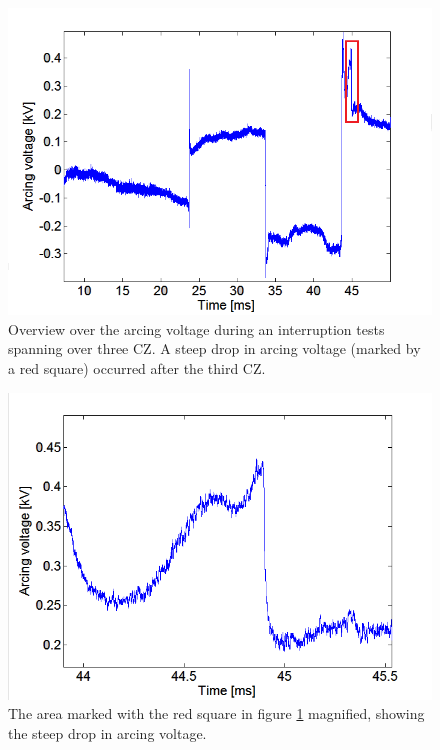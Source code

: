 \documentclass[10pt,b5paper,twoside]{article}
\begin{document}
 

\begin{figure}[H]
\centering
\includegraphics[scale=0.6, angle =0 ]{Bilder/Results/overviewArcingVoltageDrop.PNG}
\caption{Overview over the arcing voltage during an interruption tests spanning over three CZ. A steep drop in arcing voltage (marked by a red square) occurred after the third CZ.} \label{fig:arcingVoltageDrop}
\end{figure}

\begin{figure}[H]
\centering
\includegraphics[scale=0.6, angle =0 ]{Bilder/Results/zoomArcingVoltageDrop.PNG}
\caption{The area marked with the red square in figure \ref{fig:arcingVoltageDrop} magnified, showing the steep drop in arcing voltage.} \label{fig:arcingVoltageDrop_zoomed}
\end{figure}
\end{document}
